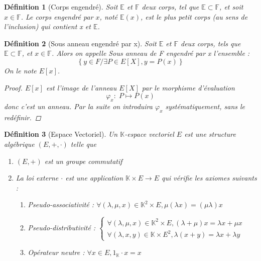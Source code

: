 \documentclass[a4paper,12pt,french]{report}
\newtheorem{definition}{Définition}[section]
\begin{document}
			\begin{definition}[Corps engendré]
				Soit \(\mathbb{E}\) et \(\mathbb{F}\) deux corps, tel que \(\mathbb{E} \subset \mathbb{F}\), et soit \(x \in \mathbb{F} \). Le corps engendré par \(x\), noté \(\mathbb{E}(x)\), est le plus petit corps (au sens de l'inclusion) qui contient x et \(\mathbb{E}\).
			\end{definition}
			
			\begin{definition}[Sous anneau engendré par x]
				Soit \(\mathbb{E}\) et \(\mathbb{F}\) deux corps, tels que \(\mathbb{E}\subset\mathbb{F}\), et \(x\in\mathbb{F}\). Alors on appelle \emph{Sous anneau de F engendré par x} l'ensemble :
				\[\left\{y\in F / \exists P \in E[X], y = P(x)\right\}\]
				On le note \(E[x]\).{}
				
				\begin{proof}
					\(E[x]\) est l'image de l'anneau \(E[X]\) par le morphisme d'évaluation \[\varphi_{x} : \; P \mapsto P(x) \] donc c'est un anneau. Par la suite on introduira \(\varphi_{x}\) systématiquement, sans le redéfinir.
				\end{proof}
				
			\end{definition}
			
			
			\begin{definition}[Espace Vectoriel]
				Un \(\mathbb{K}\)-espace vectoriel \(E\)  est une structure algébrique \( (E, + , \cdot)\) telle que
				\begin{enumerate}
					\item \( (E, +) \) est un groupe commutatif
					\item La loi externe \( \cdot \) est une application \( \mathbb{K} \times E \longrightarrow E \) qui vérifie les axiomes suivants :
						\begin{enumerate}
							\item Pseudo-associativité :
								\(
								\forall (\lambda, \mu, x) \in \mathbb{K}^2 \times E, \mu(\lambda x) = (\mu \lambda) x
								\)
							\item Pseudo-distributivité :
								\(
								\left\{
									\begin{array}{ll}
										\forall (\lambda, \mu, x) \in \mathbb{K}^2 \times E , (\lambda + \mu)x = \lambda x + \mu x \\
										\forall (\lambda, x, y) \in \mathbb{K} \times E^2 , \lambda(x + y) = \lambda x + \lambda y
									\end{array}
								\right.
								\)
							\item Opérateur neutre :
								\(
								\forall x \in E, 1_\mathbb{K} \cdot x = x
								\)
						\end{enumerate}
				\end{enumerate}
				
			\end{definition}
			
\end{document}
